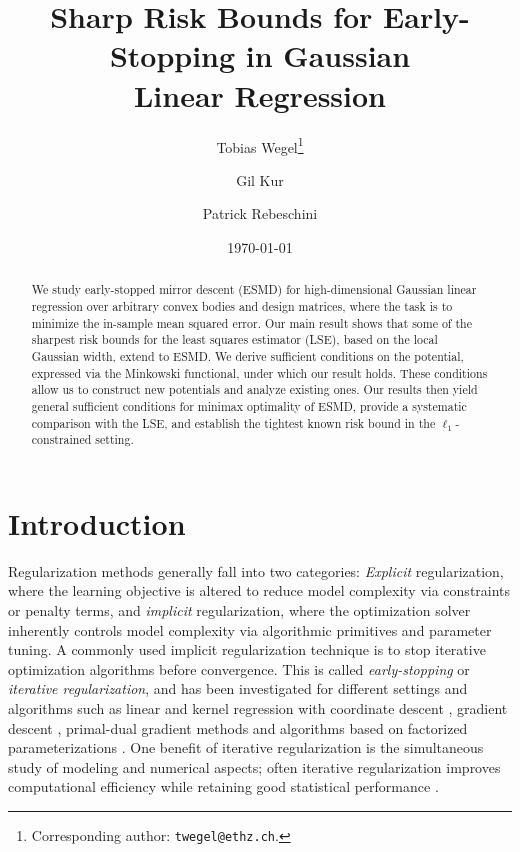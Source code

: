 \documentclass[a4paper]{article}
\title{Sharp Risk Bounds for Early-Stopping in Gaussian \\ Linear Regression}
\author[1]{Tobias Wegel\thanks{Corresponding author: \texttt{twegel@ethz.ch}.}}
\author[1]{Gil Kur}
\author[2]{Patrick Rebeschini}
\affil[1]{Department of Computer Science, ETH Zürich, Switzerland}
\affil[2]{Department of Statistics, University of Oxford, UK}
\date{\today}
\theoremstyle{thmstyle}
\theoremstyle{defstyle}
\theoremstyle{remark}
\begin{document}
\maketitle

\begin{abstract}
    \noindent 
We study early-stopped mirror descent (ESMD) for high-dimensional Gaussian linear regression over arbitrary convex bodies and design matrices, where the task is to minimize the in-sample mean squared error. Our main result shows that some of the sharpest risk bounds for the least squares estimator (LSE), based on the local Gaussian width, extend to ESMD.
We derive sufficient conditions on the potential, expressed via the Minkowski functional, under which our result holds. These conditions allow us to construct new potentials and analyze existing ones. Our results then yield general sufficient conditions for minimax optimality of ESMD, provide a systematic comparison with the LSE, and establish the tightest known risk bound in the $\ell_1$-constrained setting.
\end{abstract}


\section{Introduction}


Regularization methods generally fall into two categories: \emph{Explicit} regularization, where the learning objective is altered to reduce model complexity via constraints or penalty terms, and \emph{implicit} regularization, where the optimization solver inherently controls model complexity via algorithmic primitives and parameter tuning. A commonly used implicit regularization technique is to stop iterative optimization algorithms before convergence. This is called \emph{early-stopping} or \emph{iterative regularization}, and has been investigated for different settings and algorithms such as linear and kernel regression with coordinate descent \citep{Hastie2001statisticallearning, Efron2004Least, Rosset2004boosting, Zhang2005boosting}, gradient descent \citep{Ali2019continuous,Buhlmann2003boosting,Yao2007,Raskutti2011early,Bauer2007regularization}, primal-dual gradient methods \citep{Molinari2020iterativeregularizationconvexregularizers,Molinari2024iterative} and algorithms based on factorized parameterizations \citep{Gunasekar2017Implicit,Li2018Algorithmic,Vaskevicius2019ImplicitRegularization,Zhao2022high}.
One benefit of iterative regularization is the simultaneous study of modeling and numerical aspects; often iterative regularization improves computational efficiency while retaining good statistical performance \citep{Yao2007}.
\end{document}
